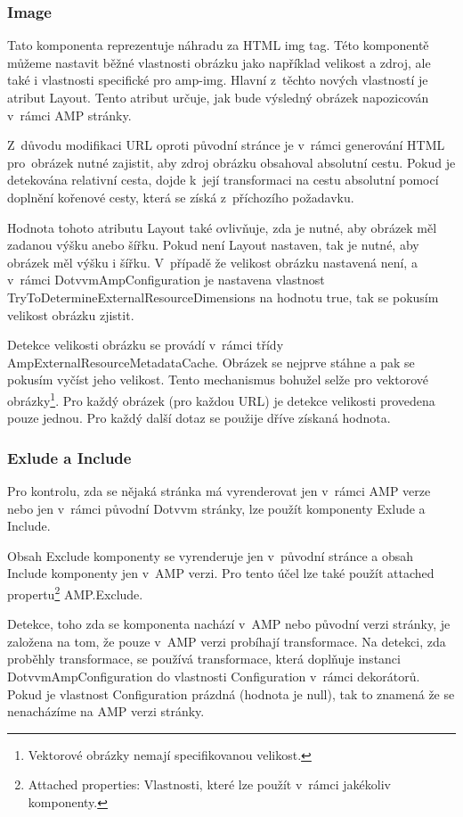  \subsubsection{Image}
 Tato komponenta reprezentuje náhradu za HTML img tag. Této komponentě můžeme nastavit běžné vlastnosti obrázku jako například velikost a zdroj, ale také i vlastnosti specifické pro amp-img. Hlavní z~těchto nových vlastností je atribut Layout. Tento atribut určuje, jak bude výsledný obrázek napozicován v~rámci AMP stránky.
 
 Z~důvodu modifikaci URL oproti původní stránce je v~rámci generování HTML pro~obrázek nutné zajistit, aby zdroj obrázku obsahoval absolutní cestu. Pokud je detekována relativní cesta, dojde k~její transformaci na cestu absolutní pomocí doplnění kořenové cesty, která se získá z~příchozího požadavku.
 
 Hodnota tohoto atributu Layout také ovlivňuje, zda je nutné, aby obrázek měl zadanou výšku anebo šířku. Pokud není Layout nastaven, tak je nutné, aby obrázek měl výšku i šířku. V~případě že velikost obrázku nastavená není, a v~rámci DotvvmAmpConfiguration je nastavena vlastnost TryToDetermineExternalResourceDimensions na hodnotu true, tak se pokusím velikost obrázku zjistit.
 
 Detekce velikosti obrázku se provádí v~rámci třídy AmpExternalResourceMetadataCache. Obrázek se nejprve stáhne a pak se pokusím vyčíst jeho velikost. Tento mechanismus bohužel selže pro vektorové obrázky\footnote{Vektorové obrázky nemají specifikovanou velikost.}. Pro každý obrázek (pro každou URL) je detekce velikosti provedena pouze jednou. Pro každý další dotaz se použije dříve získaná hodnota.
 
 \subsubsection{Exlude a Include}
 Pro kontrolu, zda se nějaká stránka má vyrenderovat jen v~rámci AMP verze nebo jen v~rámci původní Dotvvm stránky, lze použít komponenty Exlude a Include.
 
 Obsah Exclude komponenty se vyrenderuje jen v~původní stránce a obsah Include komponenty jen v~AMP verzi. Pro tento účel lze také použít attached propertu\footnote{Attached properties: Vlastnosti, které lze použít v~rámci jakékoliv komponenty.} AMP.Exclude.
 
 Detekce, toho zda se komponenta nachází v~AMP nebo původní verzi stránky, je založena na tom, že pouze v~AMP verzi probíhají transformace. Na detekci, zda proběhly transformace, se používá transformace, která doplňuje instanci DotvvmAmpConfiguration do vlastnosti Configuration v~rámci dekorátorů. Pokud je vlastnost Configuration prázdná (hodnota je null), tak to znamená že se nenacházíme na AMP verzi stránky.
 
